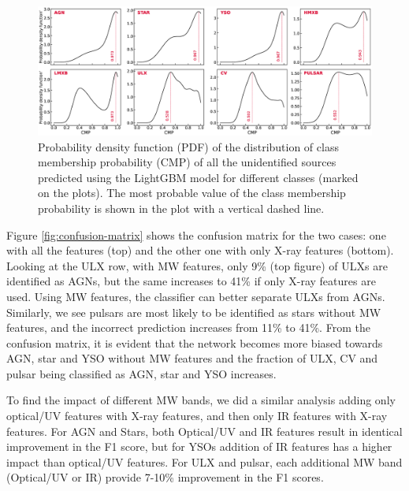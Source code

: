 \documentclass[fleqn,usenatbib]{mnras}
\begin{document}
     \begin{figure}
        \centering
        \includegraphics[width=\textwidth]{images/probability_plots_density.eps}
        \caption{Probability density function (PDF) of the distribution of class membership probability (CMP) of all the unidentified sources predicted using the LightGBM model for different classes (marked on the plots). The most probable value of the class membership probability is shown in the plot with a vertical dashed line.}
        \label{fig:prob_plots}
    \end{figure}
    Figure \ref{fig:confusion-matrix} shows the confusion matrix for the two cases: one with all the features (top) and the other one with only X-ray features (bottom).  Looking at the ULX row, with MW features, only 9\% (top figure) of ULXs are identified as AGNs, but the same increases to 41\% if only X-ray features are used. Using MW features, the classifier can better separate ULXs from AGNs. Similarly, we see pulsars are most likely to be identified as stars without MW features, and the incorrect prediction increases from 11\% to 41\%. From the confusion matrix, it is evident that the network becomes more biased towards AGN, star and YSO without MW features and the fraction of ULX, CV and pulsar being classified as AGN, star and YSO increases.

    To find the impact of different MW bands, we did a similar analysis adding only optical/UV features with X-ray features, and then only IR features with X-ray features. For AGN and Stars, both Optical/UV and IR features result in identical improvement in the F1 score, but for YSOs addition of IR features has a higher impact than optical/UV features. For ULX and pulsar, each additional MW band (Optical/UV or IR) provide 7-10\% improvement in the F1 scores.
\end{document}
